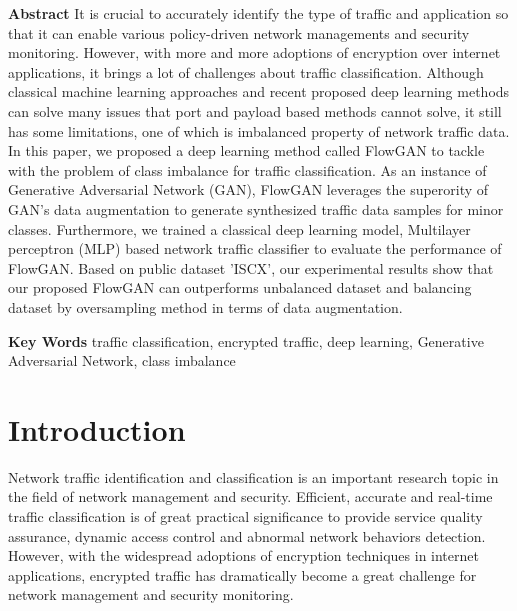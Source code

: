 \documentclass[letterpaper,12pt]{article}
\begin{document}
\noindent
{\bf\normalsize Abstract}\newline
{It is crucial to accurately identify the type of traffic and application so that it can enable various policy-driven network managements and security monitoring. However, with more and more adoptions of encryption over internet applications, it brings a lot of challenges about traffic classification. Although classical machine learning approaches and recent proposed deep learning methods can solve many issues that port and payload based methods cannot solve, it still has some limitations, one of which is imbalanced property of network traffic data. In this paper, we proposed a deep learning method called FlowGAN to tackle with the problem of class imbalance for traffic classification. As an instance of Generative Adversarial Network (GAN), FlowGAN leverages the superority of GAN's data augmentation to generate synthesized traffic data samples for minor classes.  Furthermore, we trained a classical deep learning model, Multilayer perceptron (MLP) based network traffic classifier to evaluate the performance of FlowGAN. Based on public dataset 'ISCX', our experimental results show that our proposed FlowGAN can outperforms unbalanced dataset and balancing dataset by oversampling method in terms of data augmentation. } \vspace{2ex}
   
\noindent
{\bf\normalsize Key Words}\newline
{traffic classification, encrypted traffic, deep learning, Generative Adversarial Network, class imbalance}

\section{Introduction}
Network traffic identification and classification is an important research topic in the field of network management and security. Efficient, accurate and real-time traffic classification is of great practical significance to provide service quality assurance, dynamic access control and abnormal network behaviors detection. However, with the widespread adoptions of encryption techniques in internet applications, encrypted traffic has dramatically become a great challenge for network management and security monitoring.
\end{document}
